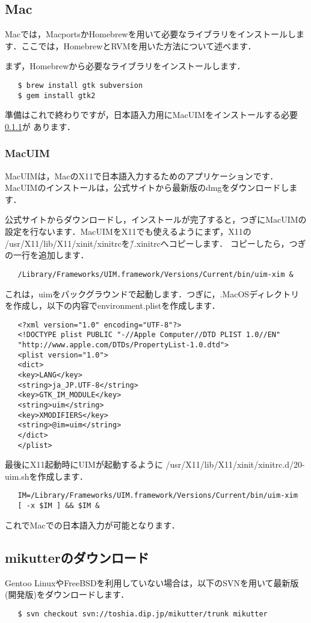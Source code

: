 \documentclass{jsarticle}
\begin{document}
  \subsection{Mac} \label{mac}
  Macでは，MacportsかHomebrewを用いて必要なライブラリをインストールしま
  す．ここでは，HomebrewとRVMを用いた方法について述べます．

  まず，Homebrewから必要なライブラリをインストールします．
  \begin{lstlisting}
   $ brew install gtk subversion
   $ gem install gtk2
  \end{lstlisting}
  準備はこれで終わりですが，日本語入力用にMacUIMをインストールする必要\ref{uim}が
  あります．

  \subsubsection{MacUIM} \label{uim}
  MacUIM\cite{macuim}は，MacのX11で日本語入力するためのアプリケーションです．
  MacUIMのインストールは，公式サイトから最新版のdmgをダウンロードします．

  公式サイトからダウンロードし，インストールが完了すると，つぎにMacUIMの
  設定を行ないます．MacUIMをX11でも使えるよう\cite{rubyneco}にまず，X11の
  /usr/X11/lib/X11/xinit/xinitrcを\~/.xinitrcへコピーします．
  コピーしたら，つぎの一行を追加します．
  \begin{lstlisting}
   /Library/Frameworks/UIM.framework/Versions/Current/bin/uim-xim &
  \end{lstlisting}
  これは，uimをバックグラウンドで起動します．つぎに，.MacOSディレクトリ
  を作成し，以下の内容でenvironment.plistを作成します．
  \begin{lstlisting}
   <?xml version="1.0" encoding="UTF-8"?>
   <!DOCTYPE plist PUBLIC "-//Apple Computer//DTD PLIST 1.0//EN"
   "http://www.apple.com/DTDs/PropertyList-1.0.dtd">
   <plist version="1.0">
   <dict>
   <key>LANG</key>
   <string>ja_JP.UTF-8</string>
   <key>GTK_IM_MODULE</key>
   <string>uim</string>
   <key>XMODIFIERS</key>
   <string>@im=uim</string>
   </dict>
   </plist>
  \end{lstlisting}
  最後にX11起動時にUIMが起動するように
  /usr/X11/lib/X11/xinit/xinitrc.d/20-uim.shを作成します．
  \begin{lstlisting}
   IM=/Library/Frameworks/UIM.framework/Versions/Current/bin/uim-xim
   [ -x $IM ] && $IM &
  \end{lstlisting}
  これでMacでの日本語入力が可能となります．
  
  \subsection{mikutterのダウンロード} \label{download}
  Gentoo LinuxやFreeBSDを利用していない場合は，以下のSVNを用いて最新版
  (開発版)をダウンロードします．
  \begin{lstlisting}
   $ svn checkout svn://toshia.dip.jp/mikutter/trunk mikutter
  \end{lstlisting}
\end{document}
